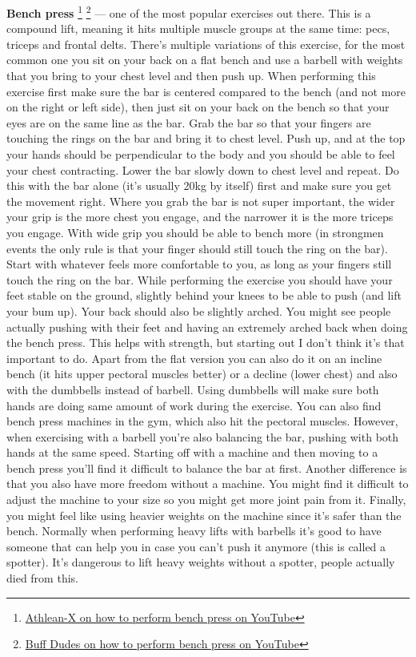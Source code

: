 \documentclass[openany, 12pt]{book}
\begin{document}
        \textbf{Bench press}
        \footnote{\href{https://www.youtube.com/watch?v=vthMCtgVtFw}{Athlean-X on how to perform bench press on YouTube}}
        \footnote{\href{https://www.youtube.com/watch?v=gRVjAtPip0Y}{Buff Dudes on how to perform bench press on YouTube}}
        --- one of the most popular exercises out there. This is a compound lift, meaning it hits multiple muscle groups at the same time: pecs, triceps and frontal delts.
        There's multiple variations of this exercise, for the most common one you sit on your back on a flat bench and use a barbell with weights that you bring to your chest level
        and then push up. When performing this exercise first make sure the bar is centered compared to the bench (and not more on the right or left side), then just sit on your back on the bench
        so that your eyes are on the same line as the bar. Grab the bar so that your fingers are touching the rings on the bar and bring it to chest level. Push up, and at the top your hands should be
        perpendicular to the body and you should be able to feel your chest contracting. Lower the bar slowly down to chest level and repeat.
        Do this with the bar alone (it's usually 20kg by itself) first and make sure you get the movement right.
        Where you grab the bar is not super important, the wider your grip is the more chest you engage, and the narrower it is the more triceps you engage. With wide grip you should be able to
        bench more (in strongmen events the only rule is that your finger should still touch the ring on the bar). Start with whatever feels more comfortable to you, as long as your fingers still
        touch the ring on the bar. While performing the exercise you should have your feet stable on the ground, slightly behind your knees 
        to be able to push (and lift your bum up). Your back should also be slightly arched.
        You might see people actually pushing with
        their feet and having an extremely arched back when doing the bench press. This helps with strength, but starting out I don't think it's that important to do.
        Apart from the flat version you can also do it on an incline bench (it hits upper pectoral muscles better) or a decline (lower chest) and also with the dumbbells instead of barbell.
        Using dumbbells will make sure both hands are doing same amount of work during the exercise. You can also find bench press machines in the gym, which also hit the pectoral muscles.
        However, when exercising with a barbell you're also balancing the bar, pushing with both hands at the same speed.
        Starting off with a machine and then
        moving to a bench press you'll find it difficult to balance the bar at first. Another difference is that you also have more freedom without a machine. You might find it difficult
        to adjust the machine to your size so you might get more joint pain from it. Finally, you might feel like using heavier weights on the machine since it's safer than the bench.
        Normally when performing heavy lifts with barbells it's good to have someone that can help you in case you can't push it anymore (this is called a spotter). It's dangerous to lift
        heavy weights without a spotter, people actually died from this.
\end{document}

